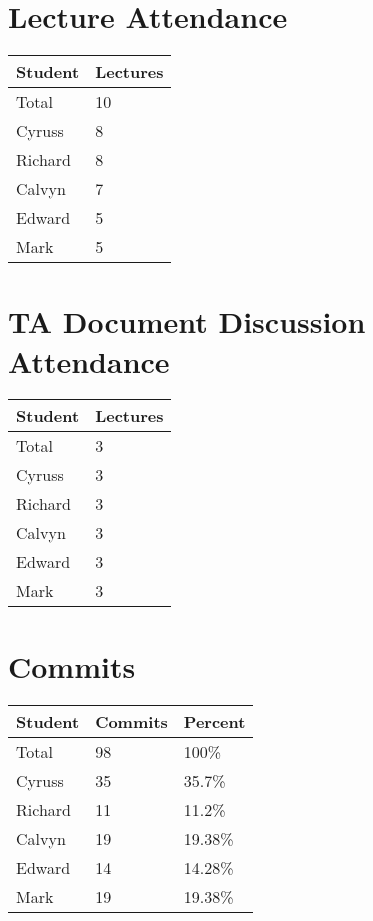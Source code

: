 \documentclass{article}
\begin{document}
\section{Lecture Attendance}

\begin{table}[H]
\centering
\begin{tabular}{ll}
\toprule
\textbf{Student} & \textbf{Lectures}\\
\midrule
Total & 10\\
Cyruss & 8\\
Richard & 8\\
Calvyn & 7\\
Edward & 5\\
Mark & 5\\
\bottomrule
\end{tabular}
\end{table}

\section{TA Document Discussion Attendance}

\begin{table}[H]
\centering
\begin{tabular}{ll}
\toprule
\textbf{Student} & \textbf{Lectures}\\
\midrule
Total & 3\\
Cyruss & 3\\
Richard & 3\\
Calvyn & 3\\
Edward & 3\\
Mark & 3\\
\bottomrule
\end{tabular}
\end{table}

\section{Commits}

\begin{table}[H]
\centering
\begin{tabular}{lll}
\toprule
\textbf{Student} & \textbf{Commits} & \textbf{Percent}\\
\midrule
Total & 98 & 100\% \\
Cyruss & 35 & 35.7\% \\
Richard & 11 & 11.2\% \\
Calvyn & 19 & 19.38\% \\
Edward & 14 & 14.28\% \\
Mark & 19 & 19.38\% \\
\bottomrule
\end{tabular}
\end{table}
\end{document}

